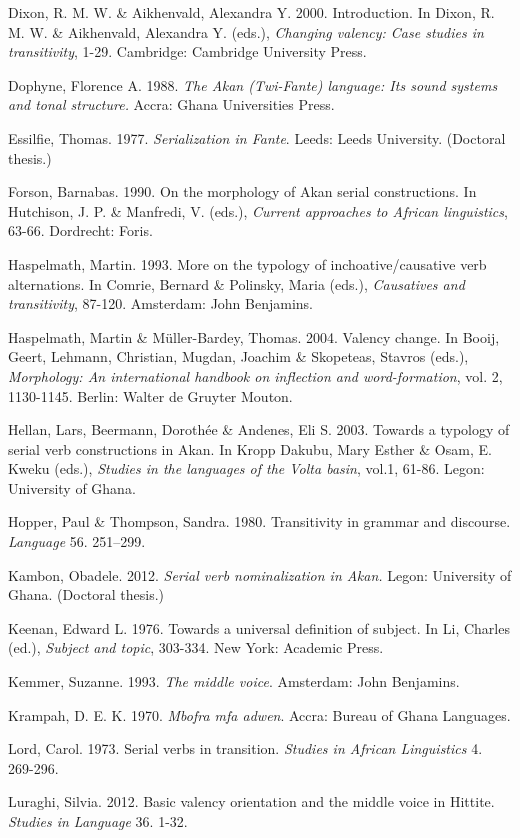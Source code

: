 \documentclass[output=paper]{langsci/langscibook}
\begin{document}
Dixon, R. M. W. \& Aikhenvald, Alexandra Y. 2000. Introduction. In Dixon, R. M. W. \& Aikhenvald, Alexandra Y. (eds.), \textit{Changing valency: Case studies in transitivity}, 1-29. Cambridge: Cambridge University Press.

Dophyne, Florence A. 1988. \textit{The Akan (Twi-Fante) language: Its sound systems and tonal structure.} Accra: Ghana Universities Press.

Essilfie, Thomas. 1977. \textit{Serialization in Fante}. Leeds: Leeds University. (Doctoral thesis.)

Forson, Barnabas. 1990. On the morphology of Akan serial constructions. In Hutchison, J. P. \& Manfredi, V. (eds.), \textit{Current approaches to African linguistics}, 63-66. Dordrecht: Foris.

Haspelmath, Martin. 1993. More on the typology of inchoative/causative verb alternations. In Comrie, Bernard \& Polinsky, Maria (eds.), \textit{Causatives and transitivity}, 87-120. Amsterdam: John Benjamins.

Haspelmath, Martin \& Müller-Bardey, Thomas. 2004. Valency change. In Booij, Geert, Lehmann, Christian, Mugdan, Joachim \& Skopeteas, Stavros (eds.), \textit{Morphology: An international handbook on inflection and word-formation}, vol. 2, 1130-1145. Berlin: Walter de Gruyter Mouton.

Hellan, Lars, Beermann, Doroth\'{e}e \& Andenes, Eli S. 2003. Towards a typology of serial verb constructions in Akan. In Kropp Dakubu, Mary Esther \& Osam, E. Kweku (eds.), \textit{Studies in the languages of the Volta basin}, vol.1, 61-86. Legon: University of Ghana.

Hopper, Paul \& Thompson, Sandra. 1980. Transitivity in grammar and discourse. \textit{Language} 56. 251–299.

Kambon, Obadele. 2012. \textit{Serial verb nominalization in Akan.} Legon: University of Ghana. (Doctoral thesis.)

Keenan, Edward L. 1976. Towards a universal definition of subject. In Li, Charles (ed.), \textit{Subject and topic}, 303-334. New York: Academic Press.

Kemmer, Suzanne. 1993. \textit{The middle voice}. Amsterdam: John Benjamins.

Krampah, D. E. K. 1970. \emph{Mbofra mfa adwen}. Accra: Bureau of Ghana Languages.

Lord, Carol. 1973. Serial verbs in transition. \textit{Studies in African Linguistics} 4. 269-296.

Luraghi, Silvia. 2012. Basic valency orientation and the middle voice in Hittite. \textit{Studies in Language} 36. 1-32.
\end{document}
